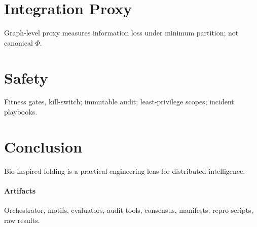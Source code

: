 \documentclass[10pt,twocolumn]{article}
\begin{document}
\section{Integration Proxy}
Graph-level proxy measures information loss under minimum partition; not canonical $\Phi$.
\section{Safety}
Fitness gates, kill-switch; immutable audit; least-privilege scopes; incident playbooks.
\section{Conclusion}
Bio-inspired folding is a practical engineering lens for distributed intelligence.
\paragraph{Artifacts} Orchestrator, motifs, evaluators, audit tools, consensus, manifests, repro scripts, raw results.
\end{document}
